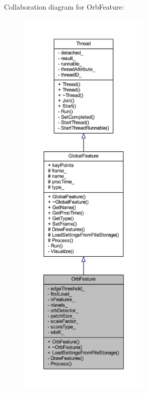 Collaboration diagram for Orb\-Feature\-:
\nopagebreak
\begin{figure}[H]
\begin{center}
\leavevmode
\includegraphics[height=550pt]{class_orb_feature__coll__graph}
\end{center}
\end{figure}
